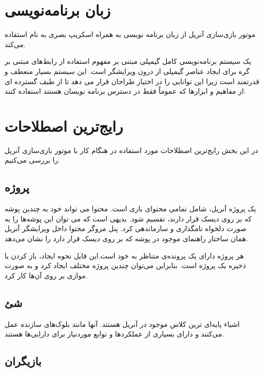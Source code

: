 \section{زبان برنامه‌نویسی}

موتور بازی‌سازی آنریل از زبان برنامه نویسی 
به همراه اسکریپ بصری به نام 
استفاده می‌کند.

یک سیستم برنامه‌نویسی کامل گیمپلی مبتنی بر مفهوم استفاده از رابط‌های مبتنی بر گره برای ایجاد عناصر گیمپلی از درون ویرایشگر است.
این سیستم بسیار منعطف و قدرتمند است زیرا این توانایی را در اختیار طراحان قرار می دهد تا از طیف گسترده ای از مفاهیم و ابزارها که عموماً فقط در دسترس برنامه نویسان هستند استفاده کنند.
\cite{UnrealEngineBlueprint}

\section{رایج‌ترین اصطلاحات}

در این بخش رایج‌ترین اصطلاحات مورد استفاده در هنگام کار با موتور بازی‌سازی آنریل را بررسی می‌کنیم.

\subsection{ پروژه }

یک پروژه آنریل، شامل تمامی محتوای بازی است. 
محتوا می تواند خود به چندین پوشه که بر روی دیسک قرار دارند، تقسیم شود.
بدیهی است که می توان این پوشه‌ها را به صورت دلخواه نامگذاری و سازماندهی کرد.
پنل مروگر محتوا داخل ویرایشگر آنریل همان ساختار راهنمای موجود در پوشه 
که بر روی دیسک قرار دارد را نشان می‌دهد.

هر پروژه دارای یک پرونده‌‌ی
متناظر به خود است.این فایل نحوه ایجاد، باز کردن یا ذخیره یک پروژه است. بنابراین می‌توان چندین پروژه مختلف ایجاد کرد و به صورت موازی بر روی آن‌ها کار کرد.

\subsection{
شئ
}

اشیاء پایه‌ای ترین کلاس موجود در آنریل هستند. آنها مانند بلوک‌های سازنده عمل می‌کنند و دارای بسیاری از عملکرد‌ها و توابع موردنیاز برای دارایی‌ها
هستند.


\subsection{
بازیگران \protect{}
}


